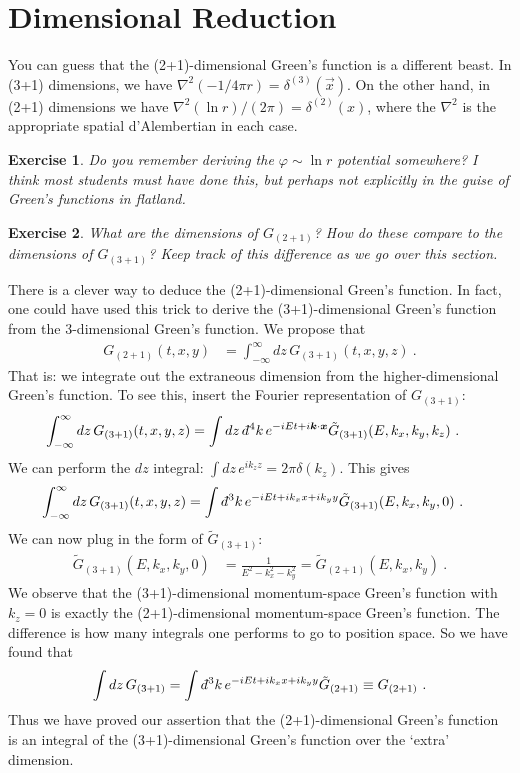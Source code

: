 \documentclass[
  11pt,
	colorful,
	raggedright,
]{tufte-style-thesis-flip}
\newtheorem{exercise}{Exercise}[section]
\renewcommand{\dbar}{d\hspace*{-0.08em}\bar{}\hspace*{0.1em}}
\begin{document}
\section{Dimensional Reduction}

You can guess that the (2+1)-dimensional Green's function is a different beast. In (3+1) dimensions, we have $\nabla^2 (-1/4\pi r) = \delta^{(3)}(\vec{x})$. On the other hand, in (2+1) dimensions we have $\nabla^2 (\ln r)/(2\pi) = \delta^{(2)}(x)$, where the $\nabla^2$ is the appropriate spatial d'Alembertian in each case.

\begin{exercise}
Do you remember deriving the $\varphi\sim \ln r$ potential somewhere? I think most students must have done this, but perhaps not explicitly in the guise of Green's functions in flatland.
\end{exercise}

\begin{exercise}
What are the dimensions of $G_{(2+1)}$? How do these compare to the dimensions of $G_{(3+1)}$? Keep track of this difference as we go over this section.
\end{exercise}

There is a clever way to deduce the (2+1)-dimensional Green's function. In fact, one could have used this trick to derive the (3+1)-dimensional Green's function from the 3-dimensional Green's function. We propose that
\begin{align}
  G_{(2+1)}(t,x,y) &= \int_{-\infty}^\infty dz\, G_{(3+1)}(t,x,y,z) \ .
\end{align}
That is: we integrate out the extraneous dimension from the higher-dimensional Green's function. To see this, insert the Fourier representation of $G_{(3+1)}$:
\begin{align}
  \int_{-\infty}^\infty dz\, G_{(3+1)}(t,x,y,z)
  &=
  \int dz\,\dbar^4k\, e^{-iEt+i\vec{k}\cdot\vec{x}} \tilde G_{(3+1)}(E,k_x,k_y,k_z) \ .
\end{align}
We can perform the $dz$ integral: $\int dz \,e^{ik_zz} = 2\pi \delta(k_z)$. This gives
\begin{align}
  \int_{-\infty}^\infty dz\, G_{(3+1)}(t,x,y,z)
  &=
  \int \dbar^3k\, e^{-iEt+ik_xx+ik_yy} \tilde G_{(3+1)}(E,k_x,k_y,0) \ .
\end{align}
We can now plug in the form of $\tilde G_{(3+1)}$:
\begin{align}
  \tilde G_{(3+1)}(E,k_x,k_y,0) &=\frac{1}{E^2-k_x^2-k_y^2} = \tilde G_{(2+1)}(E,k_x,k_y) \ .
\end{align}
 We observe that the (3+1)-dimensional momentum-space Green's function with $k_z=0$ is exactly the (2+1)-dimensional momentum-space Green's function. The difference is how many integrals one performs to go to position space. So we have found that
\begin{align}
  \int dz\, G_{(3+1)} = \int \dbar^3k\, e^{-iEt+ik_xx +ik_y y} \tilde G_{(2+1)}
  \equiv G_{(2+1)} \ .
\end{align}
Thus we have proved our assertion that the (2+1)-dimensional Green's function is an integral of the (3+1)-dimensional Green's function over the `extra' dimension.
\end{document}
